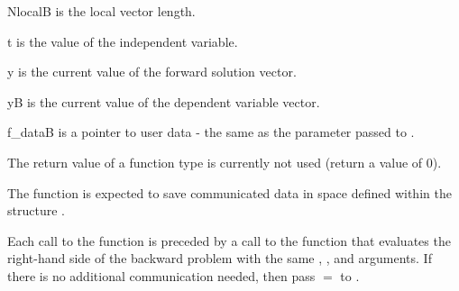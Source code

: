 {
  \begin{args}[NlocalB]
  \item[NlocalB] 
    is the local vector length.
  \item[t]
    is the value of the independent variable.
  \item[y]
    is the current value of the forward solution vector.
  \item[yB]
    is the current value of the dependent variable vector.
  \item[f\_dataB]
    is a pointer to user data - the same as the 
    parameter passed to .
  \end{args}
}
{
  The return value of a  function type is currently not used
  (return a value of 0).
}
{
  The  function is expected to save communicated data in space defined within the
  structure . 

  Each call to the  function is preceded by a call to the function that 
  evaluates the right-hand side of the backward problem with the same , , 
  and  arguments. If there is no additional communication needed, then pass
   $=$  to .
}
